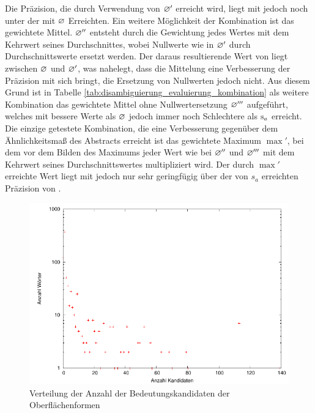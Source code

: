Die Präzision, die durch Verwendung von $\varnothing'$ erreicht wird, liegt mit  jedoch noch unter der mit $\varnothing$ Erreichten. %
Ein weitere Möglichkeit der Kombination ist das gewichtete Mittel. $\varnothing''$ entsteht durch die Gewichtung jedes Wertes mit dem Kehrwert seines Durchschnittes, wobei Nullwerte wie in $\varnothing'$ durch 
Durchschnittswerte ersetzt werden. Der daraus resultierende Wert von  liegt zwischen $\varnothing$ und $\varnothing'$, was nahelegt, dass die Mittelung eine Verbesserung der Präzision mit sich bringt,
die Ersetzung von Nullwerten jedoch nicht. Aus diesem Grund ist in Tabelle \ref{tab:disambiguierung_evaluierung_kombination} als weitere Kombination das gewichtete Mittel ohne Nullwertersetzung $\varnothing'''$ aufgeführt,
welches mit  bessere Werte als $\varnothing$ jedoch immer noch Schlechtere als $\textnormal{s}_a$ erreicht. Die einzige getestete Kombination, die eine Verbesserung gegenüber dem Ähnlichkeitsmaß des Abstracts erreicht 
ist das gewichtete Maximum $\max'$, bei dem vor dem Bilden des Maximums jeder Wert wie bei $\varnothing''$ und $\varnothing'''$ mit dem Kehrwert seines Durchschnittswertes multipliziert wird.
Der durch $\max'$ erreichte Wert liegt mit  jedoch nur sehr geringfügig über der von $s_a$ erreichten Präzision von .




\begin{figure}[tbh]
\includegraphics[height=0.4\textheight]{img/pdf/candidatenumbers.pdf}
\caption[]{Verteilung der Anzahl der Bedeutungskandidaten der Oberflächenformen}
\label{fig:disambiguierung_evaluierung_candidatenumbers}
\end{figure}

